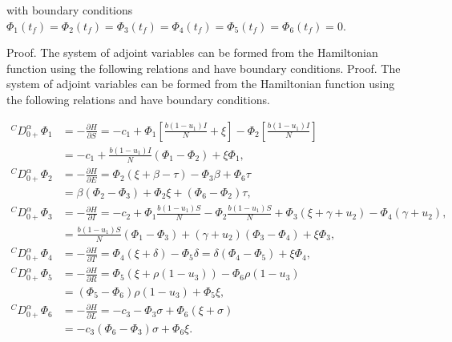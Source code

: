 \documentclass[10pt]{NSP1}
\begin{document}
with boundary conditions \(\Phi_{1}\left( t_{f} \right) = \Phi_{2}\left( t_{f} \right) = \Phi_{3}\left( t_{f} \right) = \Phi_{4}\left( t_{f} \right) = \Phi_{5}\left( t_{f} \right) = \Phi_{6}\left( t_{f} \right) = 0\).

Proof. The system of adjoint variables can be formed from the Hamiltonian function using the following relations and have boundary conditions. Proof. The system of adjoint variables can be formed from the Hamiltonian function using the following relations and have boundary conditions.

\[
\begin{matrix}
^{C}D_{0 +}^{\alpha}\Phi_{1} & = - \frac{\partial H}{\partial S} = - c_{1} + \Phi_{1}\left\lbrack \frac{b\left( 1 - u_{1} \right)I}{N} + \xi \right\rbrack - \Phi_{2}\left\lbrack \frac{b\left( 1 - u_{1} \right)I}{N} \right\rbrack \\ & = - c_{1} + \frac{b\left( 1 - u_{1} \right)I}{N}\left( \Phi_{1} - \Phi_{2} \right) + \xi\Phi_{1}, \\
^{C}D_{0 +}^{\alpha}\Phi_{2} & = - \frac{\partial H}{\partial E} = \Phi_{2}(\xi + \beta - \tau) - \Phi_{3}\beta + \Phi_{6}\tau \\ & = \beta\left( \Phi_{2} - \Phi_{3} \right) + \Phi_{2}\xi + \left( \Phi_{6} - \Phi_{2} \right)\tau, \\
^{C}D_{0 +}^{\alpha}\Phi_{3} & = - \frac{\partial H}{\partial I} = - c_{2} + \Phi_{1}\frac{b\left( 1 - u_{1} \right)S}{N} - \Phi_{2}\frac{b\left( 1 - u_{1} \right)S}{N} + \Phi_{3}\left( \xi + \gamma + u_{2} \right) - \Phi_{4}\left( \gamma + u_{2} \right), \\ & = \frac{b\left( 1 - u_{1} \right)S}{N}\left( \Phi_{1} - \Phi_{3} \right) + \left( \gamma + u_{2} \right)\left( \Phi_{3} - \Phi_{4} \right) + \xi\Phi_{3}, \\
^{C}D_{0 +}^{\alpha}\Phi_{4} & = - \frac{\partial H}{\partial T} = \Phi_{4}(\xi + \delta) - \Phi_{5}\delta = \delta\left( \Phi_{4} - \Phi_{5} \right) + \xi\Phi_{4}, \\
^{C}D_{0 +}^{\alpha}\Phi_{5} & = - \frac{\partial H}{\partial R} = \Phi_{5}\left( \xi + \rho\left( 1 - u_{3} \right) \right) - \Phi_{6}\rho\left( 1 - u_{3} \right) \\ & = \left( \Phi_{5} - \Phi_{6} \right)\rho\left( 1 - u_{3} \right) + \Phi_{5}\xi, \\
^{C}D_{0 +}^{\alpha}\Phi_{6} & = - \frac{\partial H}{\partial L} = - c_{3} - \Phi_{3}\sigma + \Phi_{6}(\xi + \sigma) \\ & = - c_{3}\left( \Phi_{6} - \Phi_{3} \right)\sigma + \Phi_{6}\xi.
\end{matrix}
\]
\end{document}
